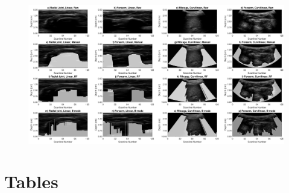 \documentclass[preprint,5p,authoryear]{elsarticle}
\begin{document}
\begin{figure}
	\centering
	\includegraphics[scale=0.4]{fig1.pdf}
\end{figure}





\pagebreak

\section*{Tables}
\end{document}
